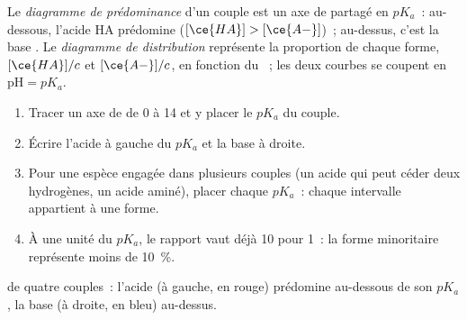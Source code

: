 \begin{definition}\label{def:g12:buffers-predominance:predominance}
Le \emph{diagramme de prédominance}
d'un couple est un axe de  partagé en $pK_a$~: au-dessous, l'acide HA
prédomine
($[\ce{HA}] > [\ce{A-}]$)~; au-dessus, c'est la base . Le
\emph{diagramme de distribution}
représente la proportion de chaque forme,
$[\ce{HA}]/c$ et $[\ce{A-}]/c$, en fonction du ~; les deux courbes se
coupent en
$\mathrm{pH} = pK_a$.
\end{definition}

\begin{method}\label{met:g12:buffers-predominance:diagram}
\begin{enumerate}
  \item Tracer un axe de  de 0 à 14 et y placer le $pK_a$ du couple.
  \item Écrire l'acide à gauche du $pK_a$ et la base à droite.
  \item Pour une espèce engagée dans plusieurs couples (un acide qui peut
        céder deux hydrogènes, un acide aminé), placer chaque $pK_a$~:
        chaque intervalle appartient à une forme.
  \item À une unité du $pK_a$, le rapport vaut déjà 10 pour 1~: la forme
        minoritaire représente moins de \qty{10}{\percent}.
\end{enumerate}
\end{method}

\begin{omfigure}

{\small {} de quatre couples~: l'acide (à
gauche, en rouge) prédomine au-dessous de son $pK_a$, la base (à droite,
en bleu) au-dessus.}
\end{omfigure}

